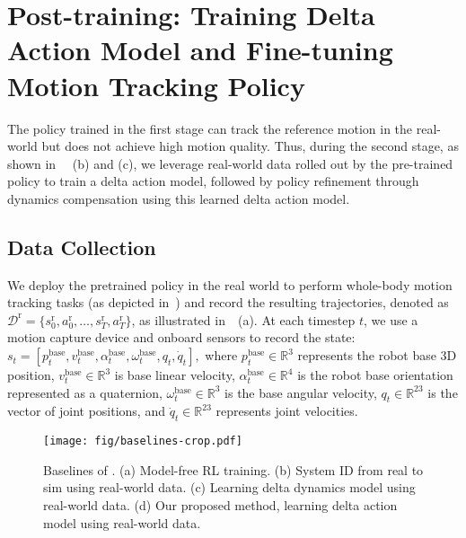 \section{Post-training: Training Delta Action Model and Fine-tuning Motion Tracking Policy}
The policy trained in the first stage can track the reference motion in the real-world but does not achieve high motion quality. Thus, during the second stage, as shown in ~~(b) and (c), we leverage real-world data rolled out by the pre-trained policy to train a delta action model, followed by policy refinement through dynamics compensation using this learned delta action model.

\subsection{Data Collection}
We deploy the pretrained policy in the real world to perform whole-body motion tracking tasks (as depicted in~) and record the resulting trajectories, denoted as $\mathcal{D}^\text{r} = \{s^\text{r}_0, a^\text{r}_0, \dots, s^\text{r}_T, a^\text{r}_T\}$, as illustrated in~~(a). At each timestep $t$, we use a motion capture device and onboard sensors to record the state: 
$
s_t = [p^\text{base}_t, v_t^\text{base}, \alpha^\text{base}_t, \omega^\text{base}_t, q_t, \dot{q}_t],
$
where $p^\text{base}_t \in \mathbb{R}^3$ represents the robot base 3D position, $v_t^\text{base} \in \mathbb{R}^3$ is base linear velocity, $\alpha^\text{base}_t \in \mathbb{R}^4$ is the robot base orientation represented as a quaternion, $\omega^\text{base}_t \in \mathbb{R}^3$ is the base angular velocity, $q_t \in \mathbb{R}^{23}$ is the vector of joint positions, and $\dot{q}_t \in \mathbb{R}^{23}$ represents joint velocities.


\begin{figure*}[t]
    \centering
    \texttt{[image: fig/baselines-crop.pdf]}
    \vspace{-1mm}
    \caption{Baselines of \method. (a) Model-free RL training. (b) System ID from real to sim using real-world data. (c) Learning delta dynamics model using real-world data. (d) Our proposed method, learning delta action model using real-world data. }
    \label{fig:baselines}
    \vspace{-4mm}
\end{figure*}

